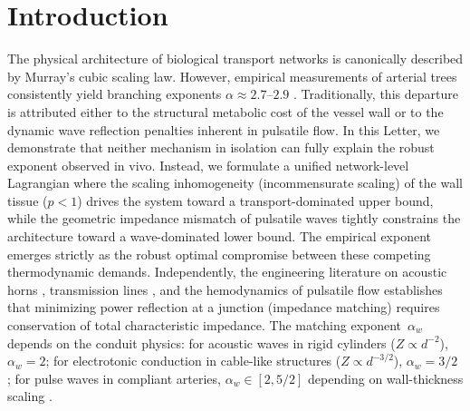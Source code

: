 \documentclass[11pt,a4paper]{article}
\theoremstyle{remark}
\begin{document}
\begin{abstract}
$\kappa_{\text{eff}}(N)$, establishing the universal preference for
bifurcations not as an anatomical assumption but as a derived property of the
unified wave-transport framework. Numerical evaluation on the porcine coronary
tree ($G=\VarG$ generations) yields $\alpha^* = \VarAlphaStar$, in quantitative
agreement with morphometric data. Sensitivity analysis confirms that this
prediction is structurally robust to metabolic parameter variation
($|\Delta\alpha^*| < 0.01$ across the physiological range of viscosity and wall
metabolic rates), depending critically only on the histological scaling exponent
$p$ --- the single parameter with direct anatomical grounding. Specifically, the
prediction is analytically insensitive to the exact value of the wall-thickness
pre-factor $c_0$, making the framework a zero-parameter derivation from
fundamental scaling principles.
\end{abstract}

\newpage

\section{Introduction}
\label{sec:intro}

The physical architecture of biological transport networks is canonically
described by Murray's cubic scaling law. However, empirical measurements of
arterial trees consistently yield branching exponents $\alpha \approx
2.7$--$2.9$ \cite{Kassab1993,Zamir1999}. Traditionally, this departure is
attributed either to the structural metabolic cost of the vessel wall or to the
dynamic wave reflection penalties inherent in pulsatile flow. In this Letter, we
demonstrate that neither mechanism in isolation can fully explain the robust
exponent observed in vivo. Instead, we formulate a unified network-level
Lagrangian where the scaling inhomogeneity (incommensurate scaling) of the wall
tissue ($p<1$) drives the system toward a transport-dominated upper bound, while
the geometric impedance mismatch of pulsatile waves tightly constrains the
architecture toward a wave-dominated lower bound. The empirical exponent emerges
strictly as the robust optimal compromise between these competing thermodynamic
demands.
Independently, the engineering literature on acoustic horns \cite{Rayleigh1896},
transmission lines \cite{Pozar2012}, and the hemodynamics of pulsatile flow
\cite{Womersley1955,Nichols2011} establishes that minimizing power reflection at
a junction (impedance matching) requires conservation of total characteristic
impedance.
The matching exponent~$\alpha_w$ depends on the conduit physics: for acoustic
waves in rigid cylinders ($Z \propto d^{-2}$), $\alpha_w = 2$; for electrotonic
conduction in cable-like structures ($Z \propto d^{-3/2}$), $\alpha_w = 3/2$
\cite{Rall1959}; for pulse waves in compliant arteries, $\alpha_w \in [2, 5/2]$
depending on wall-thickness scaling \cite{Nichols2011}.
\end{document}
